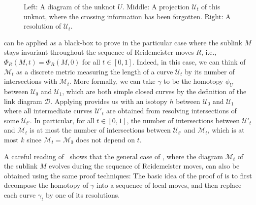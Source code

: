\documentclass{article}
\newcommand{\control}[2]{ ($#2+#1$) .. #1}
\begin{document}
\begin{figure}[ht]
\begin{center}
\caption{Left: A diagram of the unknot $U$. Middle: A projection $\mathcal{U}_t$ of this unknot, where the crossing information has been forgotten. Right: A resolution of $\mathcal{U}_t$.}
\label{pic_resolution}
\end{center}
\end{figure}

 can be applied as a black-box to prove  in the particular case where the sublink $M$ stays invariant throughout the sequence of Reidemeister moves $R$, i.e., $\Phi_R(M,t)=\Phi_R(M,0)$ for all $t \in [0,1]$. Indeed, in this case, we can think of $\mathcal{M}_t$ as a discrete metric measuring the length of a curve $\mathcal{U}_t$ by its number of intersections with $\mathcal{M}_t$. More formally, we can take $\gamma$ to be the homotopy $\phi_U$ between $\mathcal{U}_0$ and $\mathcal{U}_1$, which are both simple closed curves by the definition of the link diagram $\mathcal{D}$. Applying  provides us with an isotopy $h$ between $\mathcal{U}_0$ and $\mathcal{U}_1$ where all intermediate curves $\mathcal{U}'_t$ are obtained from resolving intersections of some $\mathcal{U}_{t'}$. In particular, for all $t \in [0,1]$, the number of intersections between $\mathcal{U}'_t$ and $\mathcal{M}_t$ is at most the number of intersections between $\mathcal{U}_{t'}$ and $\mathcal{M}_t$, which is at most $k$ since $\mathcal{M}_t=\mathcal{M}_0$ does not depend on $t$.

A careful reading of~\cite{Chambers_homo-isotopy} shows that the general case of , where the diagram $\mathcal{M}_t$ of the sublink $M$ evolves during the sequence of Reidemeister moves, can also be obtained using the same proof techniques: The basic idea of the proof of  is to first decompose the homotopy of $\gamma$ into a sequence of local moves, and then replace each curve $\gamma_t$ by one of its resolutions.
\end{document}
